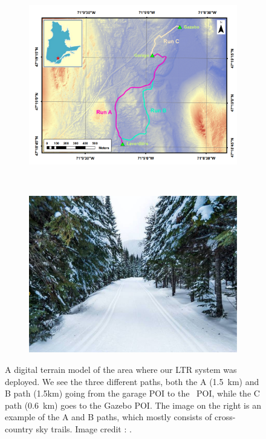 \begin{figure}[htpb]
	\begin{center}
		\begin{subfigure}[b]{0.45\textwidth}
			\includegraphics[width=\linewidth]{figs/fm_mnt.png}
			\label{fig:view_above}
		\end{subfigure}%
		~~
		\begin{subfigure}[b]{0.45\textwidth}
			\includegraphics[width=\linewidth]{figs/foret-montmorency-path.pdf}
			\label{fig:view_path}
		\end{subfigure}%
		\caption{A digital terrain model of the area where our \ac{LTR} system was deployed.
		We see the three different paths, both the A (\SI{1.5}{km}) and B path ({1.5}{km}) going from the garage \ac{POI} to the \laverdiere~\ac{POI}, while the C path (\SI{0.6}{km}) goes to the Gazebo \ac{POI}.
		The image on the right is an example of the A and B paths, which mostly consists of cross-country sky trails.
		Image credit : \foretmo.} 
		\label{fig:forest}
	\end{center}
\end{figure}

